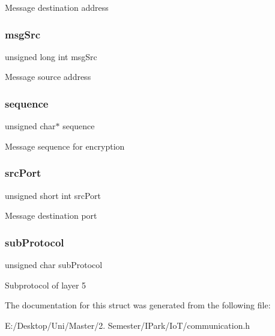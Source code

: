 Message destination address \mbox{\label{struct_m_e_s_s_a_g_e__t_a0fb10476a72a5a49fb537b51f91f28ee}} 
\subsubsection{\texorpdfstring{msg\+Src}{msgSrc}}
{\footnotesize\ttfamily unsigned long int msg\+Src}

Message source address \mbox{\label{struct_m_e_s_s_a_g_e__t_aae61c305bc218172c4fa25766255f5d8}} 
\subsubsection{\texorpdfstring{sequence}{sequence}}
{\footnotesize\ttfamily unsigned char$\ast$ sequence}

Message sequence for encryption \mbox{\label{struct_m_e_s_s_a_g_e__t_acf1bfdd1179c0d68cbfec3e5de623d70}} 
\subsubsection{\texorpdfstring{src\+Port}{srcPort}}
{\footnotesize\ttfamily unsigned short int src\+Port}

Message destination port \mbox{\label{struct_m_e_s_s_a_g_e__t_a5d41e832808c416e15e96b521c4ebfdf}} 
\subsubsection{\texorpdfstring{sub\+Protocol}{subProtocol}}
{\footnotesize\ttfamily unsigned char sub\+Protocol}

Subprotocol of layer 5 

The documentation for this struct was generated from the following file\+:\begin{DoxyCompactItemize}
\item 
E\+:/\+Desktop/\+Uni/\+Master/2. Semester/\+I\+Park/\+Io\+T/communication.\+h\end{DoxyCompactItemize}
